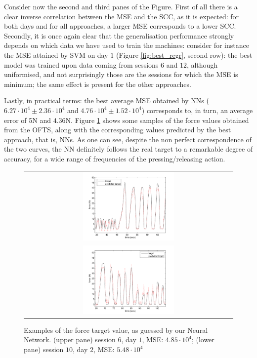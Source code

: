 Consider now the second and third panes of the Figure. First of all
there is a clear inverse correlation between the MSE and the SCC, as
it is expected: for both days and for all approaches, a larger MSE
corresponds to a lower SCC. Secondly, it is once again clear that the
generalisation performance strongly depends on which data we have used
to train the machines: consider for instance the MSE attained by SVM
on day $1$ (Figure
\ref{fig:best_regr}, second row): the best model was trained upon
data coming from sessions $6$ and $12$, although uniformised, and not
surprisingly those are the sessions for which the MSE is minimum; the
same effect is present for the other approaches.

Lastly, in practical terms: the best average MSE obtained by NNs
($6.27\cdot 10^4 \pm 2.36\cdot 10^4$ and $4.76\cdot 10^4 \pm 1.52\cdot
10^4$) corresponds to, in turn, an average error of 5N and
$4.36$N. Figure \ref{fig:regression} shows some samples of the force
values obtained from the OFTS, along with the corresponding values
predicted by the best approach, that is, NNs. As one can see, despite
the non perfect correspondence of the two curves, the NN definitely
follows the real target to a remarkable degree of accuracy, for a wide
range of frequencies of the pressing/releasing action.

\begin{figure}\centering
  \begin{tabular}{c}
    \includegraphics[width=0.45\textwidth]{figs/fig_regression1}\\
    \includegraphics[width=0.45\textwidth]{figs/fig_regression2}
  \end{tabular}
  \caption{Examples of the force target value, as guessed by our
    Neural Network. (upper pane) session $6$, day $1$, MSE: $4.85\cdot
    10^4$; (lower pane) session $10$, day $2$, MSE: $5.48\cdot 10^4$}
  \label{fig:regression}
\end{figure}
